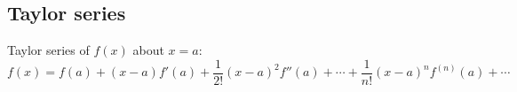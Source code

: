 \documentclass[letterpaper,landscape,10pt]{article}
\newenvironment{mydescription}
{\begin{description}
	\setlength{\itemsep}{0pt}
	\setlength{\parskip}{0pt}
	\setlength{\parsep}{-1pt}}
{\end{description}}
\begin{document}
{\begin{multicols}{3}
   
	\subsection*{Taylor series}
		Taylor series of $f(x)$ about $x=a$:\\
		$$
			f(x) = f(a) + (x-a)f'(a) + \frac{1}{2!}(x-a)^2f''(a) + \cdots +
				\frac{1}{n!}(x-a)^nf^{(n)}(a) + \cdots
		$$
	
	

\end{multicols}}
\end{document}
